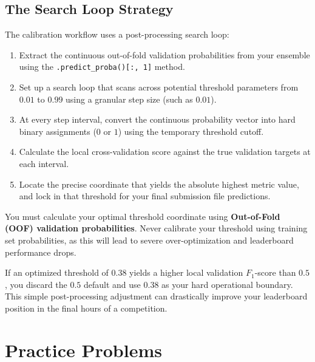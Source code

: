 \documentclass{article}
\begin{document}
\subsection{The Search Loop Strategy}
The calibration workflow uses a post-processing search loop:
\begin{enumerate}
    \item Extract the continuous out-of-fold validation probabilities from your ensemble using the \texttt{.predict\_proba()[:, 1]} method.
    \item Set up a search loop that scans across potential threshold parameters from $0.01$ to $0.99$ using a granular step size (such as $0.01$).
    \item At every step interval, convert the continuous probability vector into hard binary assignments ($0$ or $1$) using the temporary threshold cutoff.
    \item Calculate the local cross-validation score against the true validation targets at each interval.
    \item Locate the precise coordinate that yields the absolute highest metric value, and lock in that threshold for your final submission file predictions.
\end{enumerate}

\begin{tcolorbox}[colback=yellow!5!white,colframe=yellow!70!black,title=The Validation Rule]
You must calculate your optimal threshold coordinate using \textbf{Out-of-Fold (OOF) validation probabilities}. Never calibrate your threshold using training set probabilities, as this will lead to severe over-optimization and leaderboard performance drops.
\end{tcolorbox}

If an optimized threshold of $0.38$ yields a higher local validation $F_1$-score than $0.5$, you discard the $0.5$ default and use $0.38$ as your hard operational boundary. This simple post-processing adjustment can drastically improve your leaderboard position in the final hours of a competition.

\newpage
\section{Practice Problems}
\end{document}
